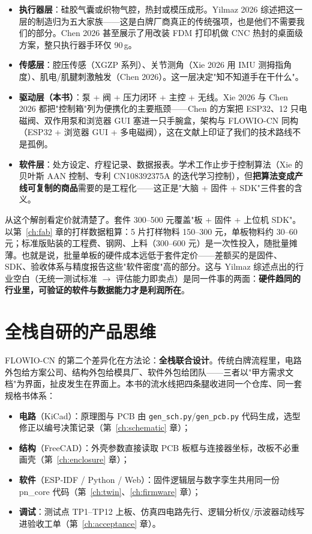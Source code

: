 \begin{itemize}
  \item \textbf{执行器层}：硅胶气囊或织物气腔，热封或模压成形。Yilmaz 2026 综述把这一层的制造归为五大家族——这是白牌厂商真正的传统强项，也是他们不需要我们的部分。Chen 2026 甚至展示了用改装 FDM 打印机做 CNC 热封的桌面级方案，整只执行器手环仅 90\,g。
  \item \textbf{传感层}：腔压传感（XGZP 系列）、关节测角（Xie 2026 用 IMU 测拇指角度）、肌电/肌腱刺激触发（Chen 2026）。这一层决定"知不知道手在干什么"。
  \item \textbf{驱动层（本书）}：泵 + 阀 + 压力闭环 + 主控 + 无线。Xie 2026 与 Chen 2026 都把"控制箱"列为便携化的主要瓶颈——Chen 的方案把 ESP32、12 只电磁阀、双作用泵和浏览器 GUI 塞进一只手腕盒，架构与 FLOWIO-CN 同构（ESP32 + 浏览器 GUI + 多电磁阀），这在文献上印证了我们的技术路线不是孤例。
  \item \textbf{软件层}：处方设定、疗程记录、数据报表。学术工作止步于控制算法（Xie 的贝叶斯 AAN 控制、专利 CN108392375A 的迭代学习控制），但\textbf{把算法变成产线可复制的商品}需要的是工程化——这正是"大脑 + 固件 + SDK"三件套的含义。
\end{itemize}

从这个解剖看定价就清楚了。套件 300--500 元覆盖"板 + 固件 + 上位机 SDK"。以第~\ref{ch:fab} 章的打样数据粗算：5 片打样物料 150--300 元，单板物料约 30--60 元；标准版贴装的工程费、钢网、上料（300--600 元）是一次性投入，随批量摊薄。也就是说，批量单板的硬件成本远低于套件定价——差额买的是固件、SDK、验收体系与精度报告这些"软件密度"高的部分。这与 Yilmaz 综述点出的行业空白（无统一测试标准 $\to$ 评估能力即卖点）是同一件事的两面：\textbf{硬件趋同的行业里，可验证的软件与数据能力才是利润所在}。

\section{全栈自研的产品思维}
\label{sec:intro-fullstack}

FLOWIO-CN 的第二个差异化在方法论：\textbf{全栈联合设计}。传统白牌流程里，电路外包给方案公司、结构外包给模具厂、软件外包给团队——三者以"甲方需求文档"为界面，扯皮发生在界面上。本书的流水线把四条腿收进同一个仓库、同一套规格书体系：

\begin{itemize}
  \item \textbf{电路}（KiCad）：原理图与 PCB 由 \texttt{gen\_sch.py}/\texttt{gen\_pcb.py} 代码生成，选型修正以编号决策记录（第~\ref{ch:schematic} 章）；
  \item \textbf{结构}（FreeCAD）：外壳参数直接读取 PCB 板框与连接器坐标，改板不必重画壳（第~\ref{ch:enclosure} 章）；
  \item \textbf{软件}（ESP-IDF / Python / Web）：固件逻辑层与数字孪生共用同一份 pn\_core 代码（第~\ref{ch:twin}、\ref{ch:firmware} 章）；
  \item \textbf{调试}：测试点 TP1--TP12 上板、仿真四电路先行、逻辑分析仪/示波器动线写进验收工单（第~\ref{ch:acceptance} 章）。
\end{itemize}

